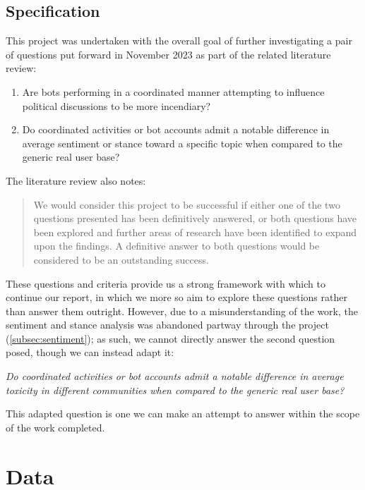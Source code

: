 \documentclass[a4paper,11pt]{article}  %
\begin{document}
	\subsection{Specification}
	\label{subsec:spec}
	This project was undertaken with the overall goal of further investigating a pair of questions put forward in November 2023 as part of the related literature review:
	\begin{enumerate}
		\item Are bots performing in a coordinated manner attempting to influence political discussions to be more incendiary?
		\item Do coordinated activities or bot accounts admit a notable difference in average sentiment or stance toward a specific topic when compared to the generic real user base?
	\end{enumerate}
	The literature review also notes:
	\begin{quote}
		We would consider this project to be successful if either one of the two questions presented has been definitively answered, or both questions have been explored and further areas of research have been identified to expand upon the findings. A definitive answer to both questions would be considered to be an outstanding success.
	\end{quote}
	These questions and criteria provide us a strong framework with which to continue our report, in which we more so aim to explore these questions rather than answer them outright. However, due to a misunderstanding of the work, the sentiment and stance analysis was abandoned partway through the project (\autoref{subsec:sentiment}); as such, we cannot directly answer the second question posed, though we can instead adapt it:

		\quad \textit{Do coordinated activities or bot accounts admit a notable difference in average toxicity in different communities when compared to the generic real user base?}

	This adapted question is one we can make an attempt to answer within the scope of the work completed.
	\section{Data}
	\label{sec:data}
\end{document}
